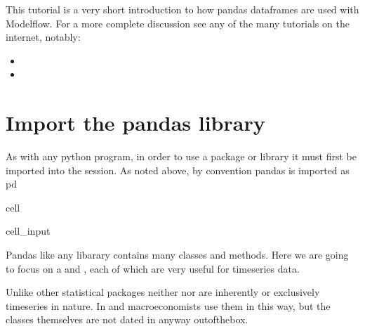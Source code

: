 \documentclass[letterpaper,10pt,english]{jupyterBook}
\begin{document}
\sphinxAtStartPar
This tutorial is a very short introduction to how pandas dataframes are used with Modelflow. For a more complete discussion see any of the many tutorials on the internet, notably:
\begin{itemize}
\item {} 
\sphinxAtStartPar
{}

\item {} 
\sphinxAtStartPar
{}

\end{itemize}


\section{Import the pandas library}
\label{\detokenize{content/04_PythonEssentials/PythonPackagesEtc:import-the-pandas-library}}
\sphinxAtStartPar
As with any python program, in order to use a package or library it must first be imported into the session. As noted above, by  convention pandas is imported as pd

\begin{sphinxuseclass}{cell}\begin{sphinxVerbatimInput}

\begin{sphinxuseclass}{cell_input}
\begin{sphinxVerbatim}[commandchars=\\\{\}]
    
\end{sphinxVerbatim}

\end{sphinxuseclass}\end{sphinxVerbatimInput}

\end{sphinxuseclass}
\sphinxAtStartPar
Pandas like any libarary contains many classes and methods.  Here we are going to focus on a  and , each of which are very useful for time\sphinxhyphen{}series data.

\sphinxAtStartPar
Unlike other statistical packages neither  nor  are inherently or exclusively time\sphinxhyphen{}series in nature.  In  and macroeconomists use them in this way, but the classes themselves are not dated in anyway out\sphinxhyphen{}of\sphinxhyphen{}the\sphinxhyphen{}box.
\end{document}
